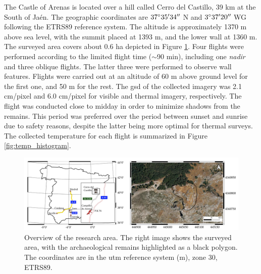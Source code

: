 The Castle of Arenas is located over a hill called Cerro del Castillo, 39 \si{\kilo\meter} at the South of Jaén. The geographic coordinates are $37^{\circ}35'34'' \hspace{1mm}$N and $3^{\circ}37'20'' \hspace{1mm}$WG following the ETRS89 reference system. The altitude is approximately 1370 \si{\meter} above sea level, with the summit placed at 1393 \si{\meter}, and the lower wall at 1360 \si{\meter}. The surveyed area covers about 0.6 \si{\hectare} depicted in Figure \ref{fig:study_site}. Four flights were performed according to the limited flight time ($\sim$90 \si{\minute}), including one \textit{nadir} and three oblique flights. The latter three were performed to observe wall features. Flights were carried out at an altitude of 60 \si{\meter} above ground level for the first one, and 50 \si{\meter} for the rest. The \acrshort{gsd} of the collected imagery was 2.1 \si{\centi\meter}/pixel and 6.0 \si{\centi\meter}/pixel for visible and thermal imagery, respectively. The flight was conducted close to midday in order to minimize shadows from the remains. This period was preferred over the period between sunset and sunrise due to safety reasons, despite the latter being more optimal for thermal surveys. The collected temperature for each flight is summarized in Figure \ref{fig:temp_histogram}. 

\begin{figure}[htbp]
  \centering
  \includegraphics[width=.92\linewidth]{figs/castle_puerta_arenas/study_area.png}
  \caption{Overview of the research area. The right image shows the surveyed area, with the archaeological remains highlighted as a black polygon. The coordinates are in the \acrshort{utm} reference system (\si{\meter}), zone 30, ETRS89.}
  \label{fig:study_site}
\end{figure}

